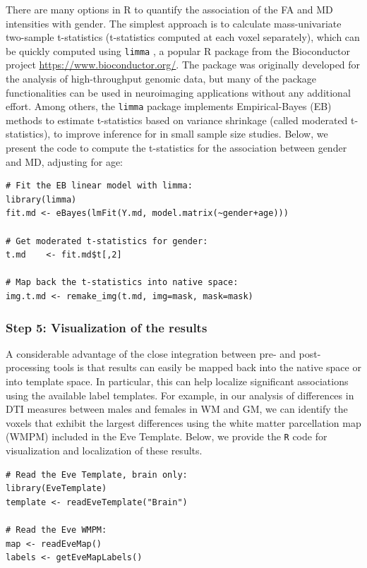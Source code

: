 \documentclass[]{elsarticle} %
\begin{document}
There are many options in R to quantify the association of the FA and MD intensities with gender. The simplest approach is to calculate mass-univariate two-sample t-statistics (t-statistics computed at each voxel separately), which can be quickly computed using \texttt{limma} \citep{limma1,limma2, limma3}, a popular R package from the Bioconductor project \url{https://www.bioconductor.org/}. The package was originally developed for the analysis of high-throughput genomic data, but many of the package functionalities can  be used in neuroimaging applications without any additional effort. Among others, the \texttt{limma} package implements Empirical-Bayes (EB) methods to estimate t-statistics based on variance shrinkage (called moderated t-statistics), to improve inference for in small sample size studies. Below, we present the code to compute the t-statistics for the association between gender and MD, adjusting for age: 

\color{blue}
\begin{verbatim}
# Fit the EB linear model with limma:
library(limma)
fit.md <- eBayes(lmFit(Y.md, model.matrix(~gender+age)))

# Get moderated t-statistics for gender:
t.md    <- fit.md$t[,2]

# Map back the t-statistics into native space:
img.t.md <- remake_img(t.md, img=mask, mask=mask)
\end{verbatim}
\color{black}

\subsubsection{Step 5: Visualization of the results}

A considerable advantage  of the close integration between pre- and post-processing tools is that results can easily be mapped back into the native space or into template space. In particular, this can help localize significant associations using the available label templates. For example, in our analysis of differences in DTI measures between males and females in WM and GM, we can identify the voxels that exhibit the largest differences using the white matter parcellation map (WMPM) \citep{eve} included in the Eve Template.  Below, we provide the \texttt{R} code for visualization and localization of these results.

\color{blue}
\begin{verbatim}
# Read the Eve Template, brain only:
library(EveTemplate)
template <- readEveTemplate("Brain")

# Read the Eve WMPM:
map <- readEveMap()
labels <- getEveMapLabels()
\end{verbatim}
\color{black}
\end{document}
